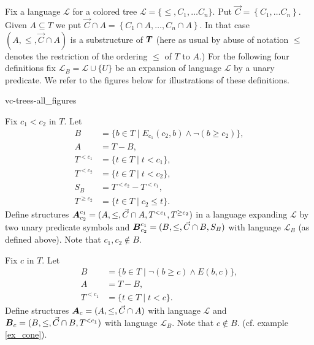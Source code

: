 \documentclass{amsart}
\DeclareMathOperator{\TT}{\boldface T}
\DeclareMathOperator{\AT}{\boldface A}
\DeclareMathOperator{\BT}{\boldface B}
\renewcommand{\LL}{\mathcal L}
\newcommand{\curly}[1]{\left\{#1\right\}}
\begin{document}
Fix a language $\LL$ for a colored tree $\LL = \{\leq, C_1, \ldots C_n\}$. Put  $\vec C = \curly{C_1, \ldots C_n}$.
Given $A \subseteq T$ we put $\vec C \cap A = \curly{C_1 \cap A, \ldots, C_n \cap A}$.
In that case $(A, \leq, \vec C \cap A)$ is a substructure of $\TT$ (here as usual by abuse of notation $\leq$ denotes the restriction of the ordering $\leq$ of $T$ to $A$.)
For the following four definitions fix $\LL_B = \LL \cup \{U\}$ be an expansion of language $\LL$ by a unary predicate.
We refer to the figures below for illustrations of these definitions.

 {vc-trees-all_figures}

\begin{Definition}
  Fix $c_1 < c_2$ in $T$. Let
  \begin{align*}
    B &= \{b \in T \mid E_{c_1}(c_2, b) \wedge \neg(b \geq c_2)\}, \\
    A &= T - B, \\
    T^{<c_1} &= \{t \in T \mid t < c_1\}, \\
    T^{<c_2} &= \{t \in T \mid t < c_2\}, \\
    S_B &= T^{<c_2} - T^{<c_1}, \\
    T^{\geq c_2} &= \{t \in T \mid c_2 \leq t\}.
  \end{align*}
  Define structures $\AT^{c_1}_{c_2} = (A, \leq, \vec C \cap A, T^{<c_1}, T^{\geq c_2})$ in a language expanding $\LL$ by two unary predicate symbols and
  $\BT^{c_1}_{c_2} = (B, \leq, \vec C \cap B, S_B)$ with language $\LL_B$ (as defined above).
  Note that $c_1, c_2 \notin B$.
\end{Definition}


\begin{Definition}
  Fix $c$ in $T$. Let
  \begin{align*}
    B &= \{b \in T \mid \neg(b \geq c) \wedge E(b,c)\}, \\
    A &= T - B, \\
    T^{<c_1} &= \{t \in T \mid t < c\}.
  \end{align*}
  Define structures $\AT_{c} = (A, \leq, \vec C \cap A)$ with language $\LL$ and $\BT_{c} = (B, \leq, \vec C\cap B, T^{<c_1})$ with language $\LL_B$.
  Note that $c \notin B$. (cf. example \ref{ex_cone}).
\end{Definition}
\end{document}
